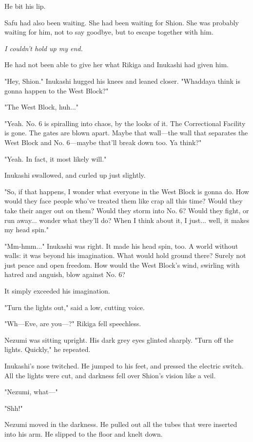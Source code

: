 He bit his lip.

Safu had also been waiting. She had been waiting for Shion. She was
probably waiting for him, not to say goodbye, but to escape together
with him.

\emph{I couldn't hold up my end.}

He had not been able to give her what Rikiga and Inukashi had given him.

"Hey, Shion." Inukashi hugged his knees and leaned closer. "Whaddaya
think is gonna happen to the West Block?"

"The West Block, huh..."

"Yeah. No. 6 is spiralling into chaos, by the looks of it. The
Correctional Facility is gone. The gates are blown apart. Maybe that
wall---the wall that separates the West Block and No. 6---maybe that'll
break down too. Ya think?"

"Yeah. In fact, it most likely will."

Inukashi swallowed, and curled up just slightly.

"So, if that happens, I wonder what everyone in the West Block is gonna
do. How would they face people who've treated them like crap all this
time? Would they take their anger out on them? Would they storm into No.
6? Would they fight, or run away... wonder what they'll do? When I think
about it, I just... well, it makes my head spin."

"Mm-hmm..." Inukashi was right. It made his head spin, too. A world
without walls: it was beyond his imagination. What would hold ground
there? Surely not just peace and open freedom. How would the West
Block's wind, swirling with hatred and anguish, blow against No. 6?

It simply exceeded his imagination.

"Turn the lights out," said a low, cutting voice.

"Wh---Eve, are you---?" Rikiga fell speechless.

Nezumi was sitting upright. His dark grey eyes glinted sharply. "Turn
off the lights. Quickly," he repeated.

Inukashi's nose twitched. He jumped to his feet, and pressed the
electric switch. All the lights were cut, and darkness fell over Shion's
vision like a veil.

"Nezumi, what---"

"Shh!"

Nezumi moved in the darkness. He pulled out all the tubes that were
inserted into his arm. He slipped to the floor and knelt down.

